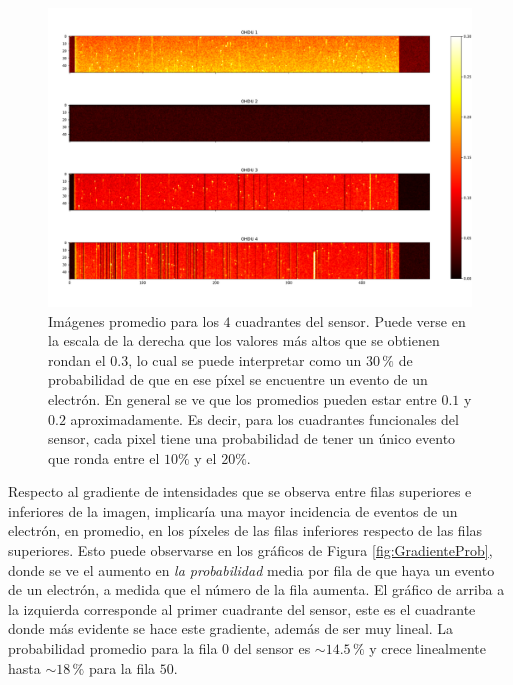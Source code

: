 \begin{figure}[h]
    \centering
    \includegraphics[scale=0.4]{Figs/1ePromedio.pdf}
    \caption{Imágenes promedio para los $4$ cuadrantes del sensor. Puede verse en la escala de la derecha que los valores más altos que se obtienen rondan el $0.3$, lo cual se puede interpretar como un $30\,\%$ de probabilidad de que en ese píxel se encuentre un evento de un electrón. En general se ve que los promedios pueden estar entre $0.1$ y $0.2$ aproximadamente. Es decir, para los cuadrantes funcionales del sensor, cada pixel tiene una probabilidad de tener un único evento que ronda entre el $10\%$ y el $20\%$.}
    \label{fig:Eventos1e}
\end{figure}
Respecto al gradiente de intensidades que se observa entre filas superiores e inferiores de la imagen, implicaría una mayor incidencia de eventos de un electrón, en promedio, en los píxeles de las filas inferiores respecto de las filas superiores. 
Esto puede observarse en los gráficos de Figura \ref{fig:GradienteProb}, donde se ve el aumento en \textit{la probabilidad} media por fila de que haya un evento de un electrón, a medida que el número de la fila aumenta. El gráfico de arriba a la izquierda corresponde al primer cuadrante del sensor, este es el cuadrante donde más evidente se hace este gradiente, además de ser muy lineal. La probabilidad promedio para la fila $0$ del sensor es $\sim 14.5\,\%$ y crece linealmente hasta $\sim 18\,\%$ para la fila $50$. 
